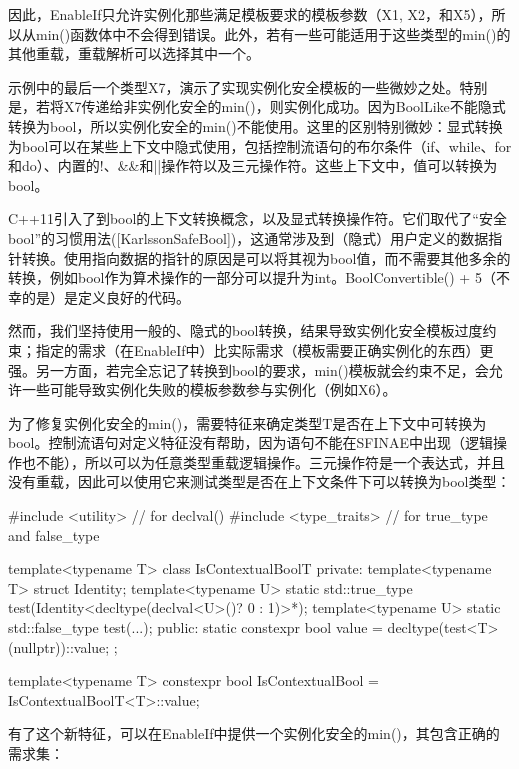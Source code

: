 因此，EnableIf只允许实例化那些满足模板要求的模板参数（X1, X2，和X5），所以从min()函数体中不会得到错误。此外，若有一些可能适用于这些类型的min()的其他重载，重载解析可以选择其中一个。

示例中的最后一个类型X7，演示了实现实例化安全模板的一些微妙之处。特别是，若将X7传递给非实例化安全的min()，则实例化成功。因为BoolLike不能隐式转换为bool，所以实例化安全的min()不能使用。这里的区别特别微妙：显式转换为bool可以在某些上下文中隐式使用，包括控制流语句的布尔条件（if、while、for和do）、内置的!、\&\&和||操作符以及三元操作符。这些上下文中，值可以转换为bool。

\begin{notice}
C++11引入了到bool的上下文转换概念，以及显式转换操作符。它们取代了“安全bool”的习惯用法([KarlssonSafeBool])，这通常涉及到（隐式）用户定义的数据指针转换。使用指向数据的指针的原因是可以将其视为bool值，而不需要其他多余的转换，例如bool作为算术操作的一部分可以提升为int。BoolConvertible() + 5（不幸的是）是定义良好的代码。
\end{notice}

然而，我们坚持使用一般的、隐式的bool转换，结果导致实例化安全模板过度约束；指定的需求（在EnableIf中）比实际需求（模板需要正确实例化的东西）更强。另一方面，若完全忘记了转换到bool的要求，min()模板就会约束不足，会允许一些可能导致实例化失败的模板参数参与实例化（例如X6）。

为了修复实例化安全的min()，需要特征来确定类型T是否在上下文中可转换为bool。控制流语句对定义特征没有帮助，因为语句不能在SFINAE中出现（逻辑操作也不能），所以可以为任意类型重载逻辑操作。三元操作符是一个表达式，并且没有重载，因此可以使用它来测试类型是否在上下文条件下可以转换为bool类型：

\begin{cpp}
#include <utility> // for declval()
#include <type_traits> // for true_type and false_type

template<typename T>
class IsContextualBoolT {
	private:
	template<typename T> struct Identity;
	template<typename U> static std::true_type
		test(Identity<decltype(declval<U>()? 0 : 1)>*);
	template<typename U> static std::false_type
		test(...);
	public:
	static constexpr bool value = decltype(test<T>(nullptr))::value;
};

template<typename T>
constexpr bool IsContextualBool = IsContextualBoolT<T>::value;
\end{cpp}

有了这个新特征，可以在EnableIf中提供一个实例化安全的min()，其包含正确的需求集：

